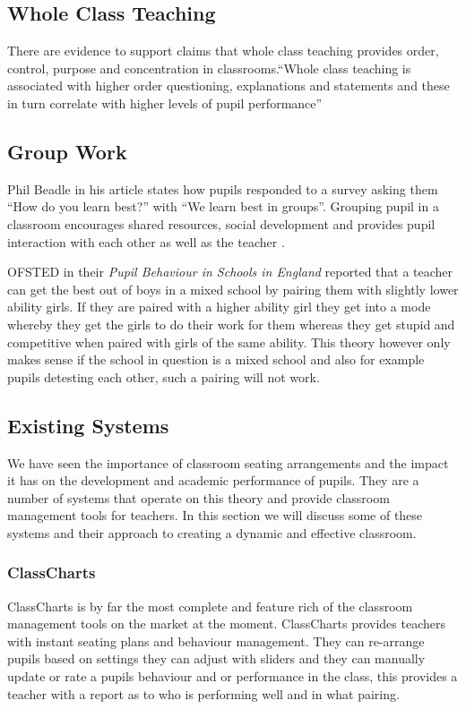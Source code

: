 \subsection{Whole Class Teaching}
There are evidence to support claims that whole class teaching provides order, control, purpose and concentration in classrooms.``Whole class teaching is associated with higher order questioning, explanations and statements and these in turn correlate with higher levels of pupil performance''\cite{alexander1992curriculum}

\subsection{Group Work}
Phil Beadle \cite{website:TES} in his article states how pupils responded to a survey asking them ``How do you learn best?'' with ``We learn best in groups''. Grouping pupil in a classroom encourages shared resources, social development and provides pupil interaction with each other as well as the teacher \cite{alexander1992curriculum}.

OFSTED \cite{OFSTED} in their \emph{Pupil Behaviour in Schools in England} reported that a teacher can get the best out of boys in a mixed school by pairing them with slightly lower ability girls. If they are paired with a higher ability girl they get into a mode whereby they get the girls to do their work for them whereas they get stupid and competitive when paired with girls of the same ability. This theory however only makes sense if the school in question is a mixed school and also for example pupils detesting each other, such a pairing will not work.

\subsection{Existing Systems}
We have seen the importance of classroom seating arrangements and the impact it has on the development and academic performance of pupils. They are a number of systems that operate on this theory and provide classroom management tools for teachers. In this section we will discuss some of these systems and their approach to creating a dynamic and effective classroom.

\subsubsection{ClassCharts} \label{sub:classchart}
ClassCharts \cite{website:ClassCharts} is by far the most complete and feature rich of the classroom management tools on the market at the moment. ClassCharts provides teachers with instant seating plans and behaviour management. They can re-arrange pupils based on settings they can adjust with sliders and they can manually update or rate a pupils behaviour and or performance in the class, this provides a teacher with a report as to who is performing well and in what pairing.

